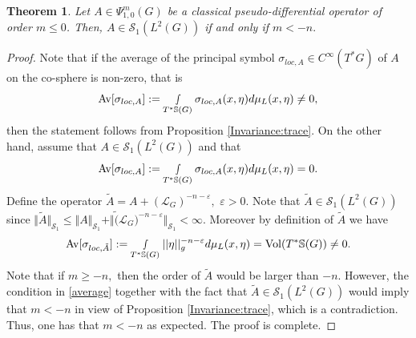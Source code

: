 \documentclass[12pt, reqno]{amsart}
\newtheorem{theorem}{Theorem}[section]
\theoremstyle{definition}
\theoremstyle{remark}
\numberwithin{equation}{section}
\begin{document}
\begin{theorem}\label{Invariance:trace2} Let $A\in \Psi^{m}_{1,0}(G)$ be a classical  pseudo-differential operator of order $m\leq 0$. 
Then, $A\in \mathscr{S}_1(L^2(G))$ if and only if $m<-n.$    
\end{theorem}
\begin{proof} Note that if the average of the principal symbol $\sigma_{loc,A}\in C^\infty(T^*G)$ of $A$ on the co-sphere is non-zero, that is
\begin{equation}\label{Average:symbol:traceclass:trace}
    \textnormal{Av}[\sigma_{loc,A}]:=\smallint\limits_{ T^{*}\mathbb{S}(G)}\sigma_{loc,A}(x,\eta)d\mu_{L}(x,\eta)\neq 0,
\end{equation}then the statement follows from Proposition \ref{Invariance:trace}. On the other hand, assume that $A\in \mathscr{S}_1(L^2(G))$ and that 
\begin{equation}
    \textnormal{Av}[\sigma_{loc,A}]:=\smallint\limits_{ T^{*}\mathbb{S}(G)}\sigma_{loc,A}(x,\eta)d\mu_{L}(x,\eta)= 0.
\end{equation}Define the operator $\tilde{A}=A+(\mathcal{L}_G)^{-n-\varepsilon},$ $\varepsilon>0.$ Note that $\tilde A\in  \mathscr{S}_1(L^2(G)) $ since $\Vert \tilde A\Vert_{\mathscr{S}_1}\leq \Vert  A\Vert_{\mathscr{S}_1}+\Vert \tilde (\mathcal{L}_G)^{-n-\varepsilon}\Vert_{\mathscr{S}_1}<\infty. $ Moreover by definition of $\tilde{A}$ we have
\begin{equation}\label{average}
    \textnormal{Av}[\sigma_{loc,\tilde A}]:=\smallint\limits_{ T^{*}\mathbb{S}(G)}||\eta||^{-n-\varepsilon}_gd\mu_{L}(x,\eta)=\textnormal{Vol}(T^*\mathbb{S}(G))\neq 0.
\end{equation}Note that if $m\geq -n,$ then the order of $\tilde A$ would be larger than $-n$. However,  the condition in  \eqref{average} together with the fact that $\tilde A\in \mathscr{S}_1(L^2(G))$ would imply that $m<-n$ in view of Proposition \ref{Invariance:trace}, which is a contradiction. Thus, one has that $m<-n$ as expected. The proof is complete.   
\end{proof}
\end{document}
